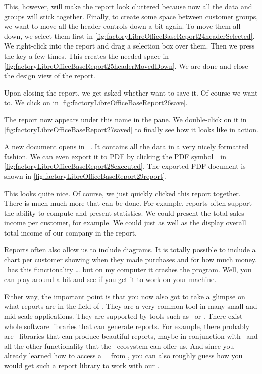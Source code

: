 This, however, will make the report look cluttered because now all the data and groups will stick together.
Finally, to create some space between customer groups, we want to move all the header controls down a bit again.
To move them all down, we select them first in \cref{fig:factoryLibreOfficeBaseReport24headerSelected}.
We right-click into the report and drag a selection box over them.
Then we press the \keys{\arrowkeydown} key a few times.
This creates the needed space in \cref{fig:factoryLibreOfficeBaseReport25headerMovedDown}.
We are done and close the design view of the report.

Upon closing the report, we get asked whether want to save it.
Of course we want to.
We click on  in \cref{fig:factoryLibreOfficeBaseReport26save}.

The report now appears under this name in the  pane.
We double-click on it in \cref{fig:factoryLibreOfficeBaseReport27saved} to finally see how it looks like in action.

A new document opens in \libreoffice\ .
It contains all the data in a very nicely formatted fashion.
We can even export it to PDF by clicking the PDF symbol~\libreOfficePdf\ in \cref{fig:factoryLibreOfficeBaseReport28executed}.
The exported PDF document is shown in \cref{fig:factoryLibreOfficeBaseReport29report}.

This looks quite nice.
Of course, we just quickly clicked this report together.
There is much much more that can be done.
For example, reports often support the ability to compute and present statistics.
We could present the total sales income per customer, for example.
We could just as well as the display overall total income of our company in the report.

Reports often also allow us to include diagrams.
It is totally possible to include a chart per customer showing when they made purchases and for how much money.
\libreofficeBase\ has this functionality {\dots} but on my computer it crashes the program.
Well, you can play around a bit and see if you get it to work on your machine.

Either way, the important point is that you now also got to take a glimpse on what reports are in the field of .
They are a very common tool in many small and mid-scale applications.
They are supported by tools such as \libreofficeBase\ or \microsoftAccess.
There exist whole software libraries that can generate reports.
For example, there probably are \python\ libraries that can produce beautiful reports, maybe in conjunction with \matplotlib\ and all the other functionality that the \python\ ecosystem can offer us.
And since you already learned how to access a \postgresql\ \db\ from \python, you can also roughly guess how you would get such a report library to work with our \db.%
%
\FloatBarrier%
\endhsection%
%
